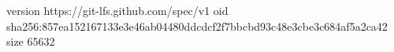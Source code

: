 version https://git-lfs.github.com/spec/v1
oid sha256:857ea152167133e3e46ab04480ddcdcf2f7bbcbd93c48e3cbe3c684af5a2ca42
size 65632
